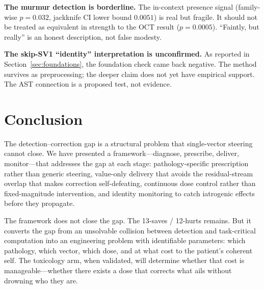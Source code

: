 \documentclass[11pt,a4paper]{article}
\begin{document}
\textbf{The murmur detection is borderline.} The in-context presence signal
(family-wise $p{=}0.032$, jackknife CI lower bound $0.0051$) is real but
fragile. It should not be treated as equivalent in strength to the OCT result
($p{=}0.0005$). ``Faintly, but really'' is an honest description, not false
modesty.

\textbf{The skip-SV1 ``identity'' interpretation is unconfirmed.} As reported
in Section~\ref{sec:foundations}, the foundation check came back negative. The
method survives as preprocessing; the deeper claim does not yet have empirical
support. The AST connection is a proposed test, not evidence.

\section{Conclusion}
\label{sec:conclusion}

The detection--correction gap is a structural problem that single-vector
steering cannot close. We have presented a framework---diagnose, prescribe,
deliver, monitor---that addresses the gap at each stage: pathology-specific
prescription rather than generic steering, value-only delivery that avoids
the residual-stream overlap that makes correction self-defeating, continuous
dose control rather than fixed-magnitude intervention, and identity monitoring
to catch iatrogenic effects before they propagate.

The framework does not close the gap. The 13-saves / 12-hurts remains. But it
converts the gap from an unsolvable collision between detection and task-critical
computation into an engineering problem with identifiable parameters: which
pathology, which vector, which dose, and at what cost to the patient's coherent
self. The toxicology arm, when validated, will determine whether that cost is
manageable---whether there exists a dose that corrects what ails without
drowning who they are.



\end{document}

